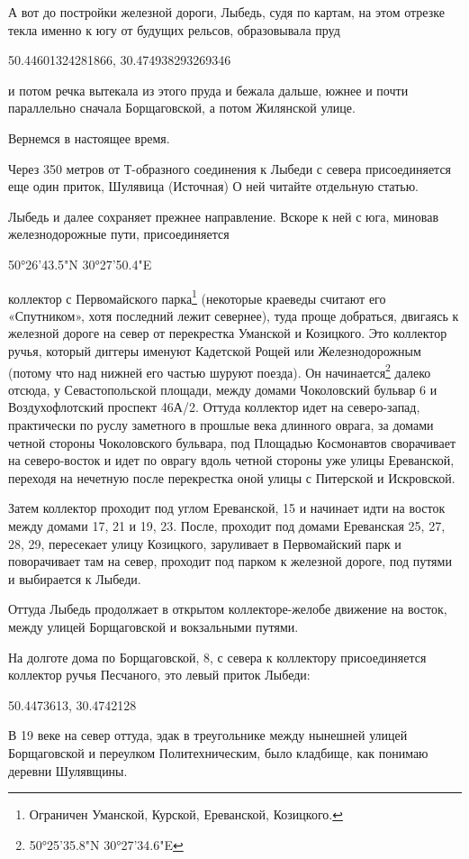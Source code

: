 А вот до постройки железной дороги, Лыбедь, судя по картам, на этом отрезке текла именно к югу от будущих рельсов, образовывала пруд

50.44601324281866, 30.474938293269346

и потом речка вытекала из этого пруда и бежала дальше, южнее и почти параллельно сначала Борщаговской, а потом Жилянской улице.

Вернемся в настоящее время.

Через 350 метров от Т-образного соединения к Лыбеди с севера присоединяется еще один приток, Шулявица (Источная) О ней читайте отдельную статью.

Лыбедь и далее сохраняет прежнее направление. Вскоре к ней с юга, миновав железнодорожные пути, присоединяется

50°26'43.5"N 30°27'50.4"E

коллектор с Первомайского парка\footnote{Ограничен Уманской, Курской, Ереванской, Козицкого.} (некоторые краеведы считают его «Спутником», хотя последний лежит севернее), туда проще добраться, двигаясь к железной дороге на север от перекрестка Уманской и Козицкого. Это коллектор ручья, который диггеры именуют Кадетской Рощей или Железнодорожным (потому что над нижней его частью шуруют поезда). Он начинается\footnote{50°25'35.8"N 30°27'34.6"E} далеко отсюда, у Севастопольской площади, между домами Чоколовский бульвар 6 и Воздухофлотский проспект 46А/2. Оттуда коллектор идет на северо-запад, практически по руслу заметного в прошлые века длинного оврага, за домами четной стороны Чоколовского бульвара, под Площадью Космонавтов сворачивает на северо-восток и идет по оврагу вдоль четной стороны уже улицы Ереванской, переходя на нечетную после перекрестка оной улицы с Питерской и Искровской. 

Затем коллектор проходит под углом Ереванской, 15 и начинает идти на восток между домами 17, 21 и 19, 23. После, проходит под домами Ереванская 25, 27, 28, 29, пересекает улицу Козицкого, заруливает в Первомайский парк и поворачивает там на север, проходит под парком к железной дороге, под путями и выбирается к Лыбеди.

Оттуда Лыбедь продолжает в открытом кол\-лекторе-желобе движение на восток, между улицей Борщаговской и вокзальными путями.

На долготе дома по Борщаговской, 8, с севера к коллектору присоединяется коллектор ручья Песчаного, это левый приток Лыбеди:

50.4473613, 30.4742128

В 19 веке на север оттуда, эдак в треугольнике между нынешней улицей Борщаговской и переулком Политехническим, было кладбище, как понимаю деревни Шулявщины.


